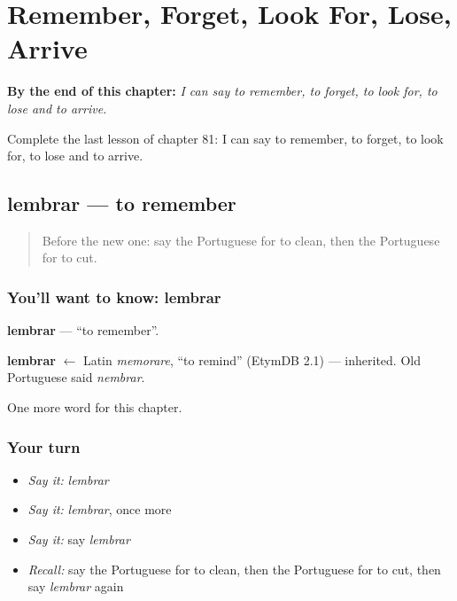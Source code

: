 
\chapter{Remember, Forget, Look For, Lose, Arrive}
\label{ch:pt-remember-forget-look-for-lose-arrive}

\begin{chapteropening}
\textbf{By the end of this chapter:} \emph{I can say to remember, to forget, to look for, to lose and to arrive.}

Complete the last lesson of chapter 81: I can say to remember, to forget, to look for, to lose and to arrive.
\end{chapteropening}

\section[lembrar]{lembrar — to remember}

\label{lesson:PT-C81-lembrar}



\begin{quote}
Before the new one: say the Portuguese for to clean, then the Portuguese for to cut.
\end{quote}

\subsection*{You'll want to know: lembrar}
\textbf{lembrar} — \textquotedblleft{}to remember\textquotedblright{}.

\begin{cousinweb}
\textbf{lembrar} $\leftarrow$ Latin \emph{memorare}, \textquotedblleft{}to remind\textquotedblright{} (EtymDB 2.1) — inherited. Old Portuguese said \emph{nembrar}.
\end{cousinweb}

\begin{grammarlens}[title={What you've built}]
One more word for this chapter.
\end{grammarlens}

\subsection*{Your turn}
\begin{itemize}
\raggedright
  \item \emph{Say it:} \emph{lembrar}
  \item \emph{Say it:} \emph{lembrar}, once more
  \item \emph{Say it:} say \emph{lembrar}
  \item \emph{Recall:} say the Portuguese for to clean, then the Portuguese for to cut, then say \emph{lembrar} again
\end{itemize}

